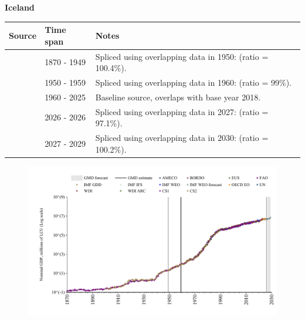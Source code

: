 \documentclass[12pt,a4paper,landscape]{article}
\begin{document}
\begin{adjustbox}{max totalsize={\paperwidth}{\paperheight},center}
\begin{minipage}[t][\textheight][t]{\textwidth}
\vspace*{0.5cm}
{}
\begin{center}
{\Large\bfseries Iceland}
\end{center}
\vspace{0.5cm}
\begin{table}[H]
\centering
\small
\begin{tabular}{|l|l|l|}
\hline
\textbf{Source} & \textbf{Time span} & \textbf{Notes} \\
\hline
\rowcolor{white}\cite{CS1_ISL}& 1870 - 1949 &Spliced using overlapping data in 1950: (ratio = 100.4\%).\\
\rowcolor{lightgray}\cite{IMF_GDD}& 1950 - 1959 &Spliced using overlapping data in 1960: (ratio = 99\%).\\
\rowcolor{white}\cite{OECD_EO}& 1960 - 2025 &Baseline source, overlaps with base year 2018.\\
\rowcolor{lightgray}\cite{AMECO}& 2026 - 2026 &Spliced using overlapping data in 2027: (ratio = 97.1\%).\\
\rowcolor{white}\cite{IMF_WEO_forecast}& 2027 - 2029 &Spliced using overlapping data in 2030: (ratio = 100.2\%).\\
\hline
\end{tabular}
\end{table}
\begin{figure}[H]
\centering
\includegraphics[width=\textwidth,height=0.6\textheight,keepaspectratio]{graphs/ISL_nGDP.pdf}
\end{figure}
\end{minipage}
\end{adjustbox}
\end{document}
